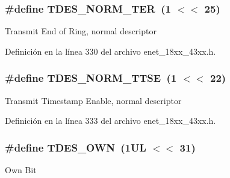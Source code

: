 \subsubsection[{\texorpdfstring{T\+D\+E\+S\+\_\+\+N\+O\+R\+M\+\_\+\+T\+ER}{TDES_NORM_TER}}]{\setlength{\rightskip}{0pt plus 5cm}\#define T\+D\+E\+S\+\_\+\+N\+O\+R\+M\+\_\+\+T\+ER~(1 $<$$<$ 25)}\hypertarget{group___e_n_e_t__18_x_x__43_x_x_gac680d00454fa37169be41e38e2188dbe}{}\label{group___e_n_e_t__18_x_x__43_x_x_gac680d00454fa37169be41e38e2188dbe}
Transmit End of Ring, normal descriptor 

Definición en la línea 330 del archivo enet\+\_\+18xx\+\_\+43xx.\+h.

\subsubsection[{\texorpdfstring{T\+D\+E\+S\+\_\+\+N\+O\+R\+M\+\_\+\+T\+T\+SE}{TDES_NORM_TTSE}}]{\setlength{\rightskip}{0pt plus 5cm}\#define T\+D\+E\+S\+\_\+\+N\+O\+R\+M\+\_\+\+T\+T\+SE~(1 $<$$<$ 22)}\hypertarget{group___e_n_e_t__18_x_x__43_x_x_ga658ec604ac367e4fee89636fda9407b6}{}\label{group___e_n_e_t__18_x_x__43_x_x_ga658ec604ac367e4fee89636fda9407b6}
Transmit Timestamp Enable, normal descriptor 

Definición en la línea 333 del archivo enet\+\_\+18xx\+\_\+43xx.\+h.

\subsubsection[{\texorpdfstring{T\+D\+E\+S\+\_\+\+O\+WN}{TDES_OWN}}]{\setlength{\rightskip}{0pt plus 5cm}\#define T\+D\+E\+S\+\_\+\+O\+WN~(1\+U\+L $<$$<$ 31)}\hypertarget{group___e_n_e_t__18_x_x__43_x_x_ga16c27e1736ee5619800a4cf892aab519}{}\label{group___e_n_e_t__18_x_x__43_x_x_ga16c27e1736ee5619800a4cf892aab519}
Own Bit 

